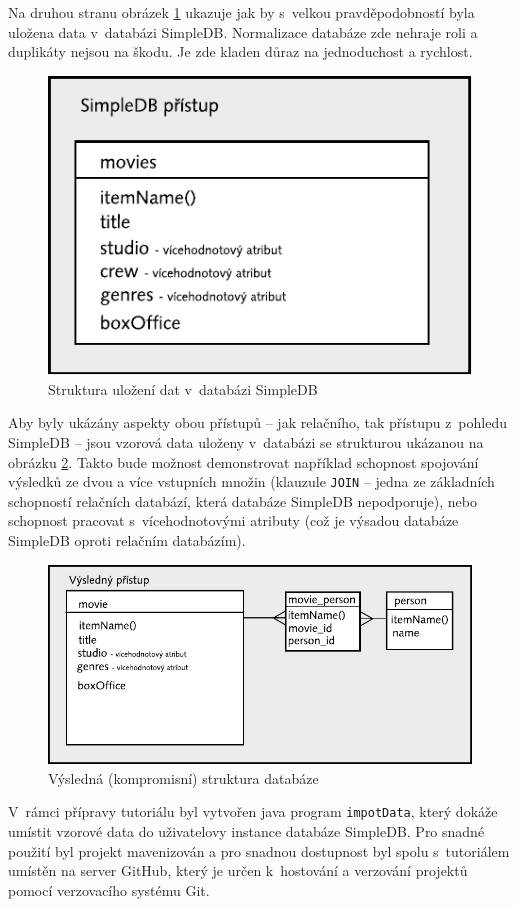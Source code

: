 \documentclass[oneside,12pt]{fithesis2}
\begin{document}
Na druhou stranu obrázek \ref{simpledbStructure} ukazuje jak by s~velkou pravděpodobností byla uložena data v~databázi SimpleDB. Normalizace databáze zde nehraje roli a duplikáty nejsou na škodu. Je zde kladen důraz na jednoduchost a rychlost.
\begin{figure}[h]
 \centering
 \includegraphics[scale=0.8]{simpledbStructure}
 \caption{Struktura uložení dat v~databázi SimpleDB}
 \label{simpledbStructure}
\end{figure}

Aby byly ukázány aspekty obou přístupů -- jak relačního, tak přístupu z~pohledu SimpleDB -- jsou vzorová data uloženy v~databázi se strukturou ukázanou na obrázku \ref{kompromisStructure}. Takto bude možnost demonstrovat například schopnost spojování výsledků ze dvou a více vstupních množin (klauzule \texttt{JOIN} -- jedna ze základních schopností relačních databází, která databáze SimpleDB nepodporuje), nebo schopnost pracovat s~vícehodnotovými atributy (což je výsadou databáze SimpleDB oproti relačním databázím).

\begin{figure}[h]
 \centering
 \includegraphics[scale=0.8]{kompromisStructure}
 \caption{Výsledná (kompromisní) struktura databáze}
 \label{kompromisStructure}
\end{figure}
\vspace{30mm}
V~rámci přípravy tutoriálu byl vytvořen java program \texttt{impotData}, který dokáže umístit vzorové data do uživatelovy instance databáze SimpleDB. Pro snadné použití byl projekt mavenizován a pro snadnou dostupnost byl spolu s~tutoriálem umístěn na server GitHub, který je určen k~hostování a verzování projektů pomocí verzovacího systému Git.
\end{document}

